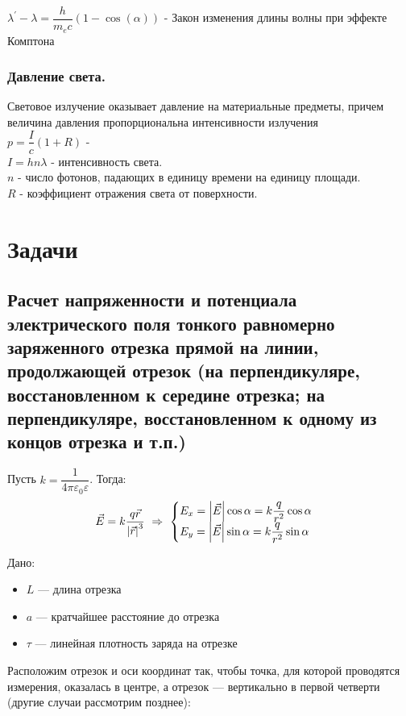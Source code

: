 \documentclass[12pt]{report}
\begin{document}
$\lambda^{'}-\lambda = \dfrac{h}{m_ec} (1-\cos(\alpha))$ - Закон изменения длины волны при эффекте
Комптона
\subsection{ Давление света.}
Световое излучение оказывает давление на
материальные предметы, причем величина давления
пропорциональна интенсивности излучения\\

$p=\dfrac{I}{c}(1+R)$ - \\

$I=hn\lambda$ - интенсивность света.\\

$n$ - число фотонов, падающих в единицу времени на единицу
площади.\\

$R$ - коэффициент отражения света от поверхности.

\chapter{Задачи}
\section{Расчет напряженности и потенциала электрического поля тонкого равномерно заряженного отрезка прямой на линии, продолжающей отрезок (на перпендикуляре, восстановленном к середине отрезка; на перпендикуляре, восстановленном к одному из концов отрезка и т.п.)}
Пусть $k = \dfrac{1}{4\pi \varepsilon_0 \varepsilon}$. Тогда:
\[
    \vec{E} = k\dfrac{q\vec{r}}{\abs{\vec{r}}^3} \ \Rightarrow\ \begin{cases}
        E_x = \abs{\vec{E}} \cos{\alpha} = k\dfrac{q}{r^2} \cos{\alpha} \\
        E_y = \abs{\vec{E}} \sin{\alpha} = k\dfrac{q}{r^2} \sin{\alpha}
    \end{cases}
\]

Дано:
\begin{itemize}
    \item $L$ --- длина отрезка
    \item $a$ --- кратчайшее расстояние до отрезка
    \item $\tau$ --- линейная плотность заряда на отрезке
\end{itemize}

Расположим отрезок и оси координат так, чтобы точка, для которой проводятся измерения, оказалась в центре, а отрезок --- вертикально в первой четверти (другие случаи рассмотрим позднее):
\end{document}
